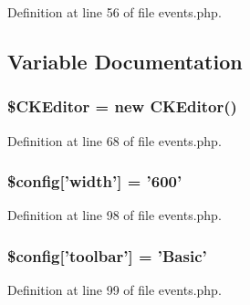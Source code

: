 Definition at line 56 of file events.php.








\subsection{Variable Documentation}
\hypertarget{events_8php_aec6d261a24c9dcb30ee1cfa7762a4a44}{
\subsubsection[{\$CKEditor}]{\setlength{\rightskip}{0pt plus 5cm}\${\bf CKEditor} = new {\bf CKEditor}()}}
\label{events_8php_aec6d261a24c9dcb30ee1cfa7762a4a44}


Definition at line 68 of file events.php.

\hypertarget{events_8php_a408217578a0d3d323ea2981957783cb8}{
\subsubsection[{\$config}]{\setlength{\rightskip}{0pt plus 5cm}\${\bf config}\mbox{[}'width'\mbox{]} = '600'}}
\label{events_8php_a408217578a0d3d323ea2981957783cb8}


Definition at line 98 of file events.php.

\hypertarget{events_8php_aea8fdfb38b8f02d1fc431d35e6dfc892}{
\subsubsection[{\$config}]{\setlength{\rightskip}{0pt plus 5cm}\${\bf config}\mbox{[}'toolbar'\mbox{]} = 'Basic'}}
\label{events_8php_aea8fdfb38b8f02d1fc431d35e6dfc892}


Definition at line 99 of file events.php.

